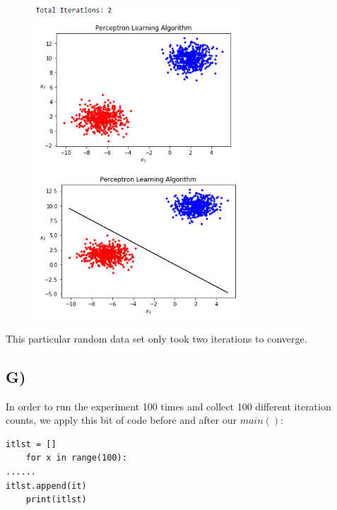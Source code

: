 \documentclass[a4paper]{article}
\begin{document}
\begin{figure}[h]
  \begin{center}
    \includegraphics[width=80mm,scale=0.8]{problem14F.png}
  \end{center}
\end{figure}

This particular random data set only took two iterations to converge.

\newpage

\subsection{G)}
In order to run the experiment 100 times and collect 100 different iteration counts, we apply this bit of code before and after our $main()$:
\begin{lstlisting}[frame=single]
itlst = []
    for x in range(100):
......
itlst.append(it)
    print(itlst)
\end{lstlisting}
\end{document}
